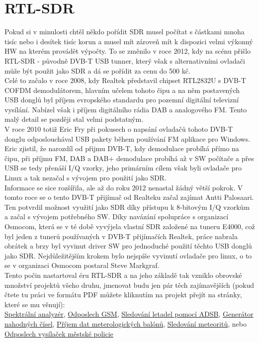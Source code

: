 \documentclass{ctuthesis}
\begin{document}
\section{RTL-SDR}
Pokud si v minulosti chtěl někdo pořídit SDR musel počítat s částkami mnoha tisíc nebo i desítek tisíc korun a musel mít zároveň mít k dispozici velmi výkonný HW na kterém provádět výpočty. To se změnilo v roce 2012, kdy na scénu přišlo RTL-SDR - původně DVB-T USB tunner, který však s alternativními ovladači může být použit jako SDR a dá se pořídit za cenu do 500 kč.\\
Celé to začalo v roce 2008, kdy Realtek představil chipset RTL2832U s  DVB-T COFDM demodulátorem, hlavním učelem tohoto čipu a na něm postavených USB donglů byl příjem evropského standardu pro pozemní digitální televizní vysílání. Nabízel však i příjem digitálního rádia DAB a analogového FM. Tento malý detail se později stal velmi podstatným.\\
V roce 2010 totiž Eric Fry při pokusech o napsání ovladačů tohoto DVB-T donglu odposlouchával USB pakety během používání FM aplikace pro Windows. Eric zjistil, že narozdíl od přijmu DVB-T, kdy demodulace probíhá přímo na čipu, při příjmu FM, DAB a DAB+ demodulace probíhá až v SW počítače a přes USB se tedy přenáší I/Q vzorky, jeho primárním cílem však byli ovladače pro Linux a tak nezačal s vývojem pro použití jako SDR.\\
Informace se sice rozšířila, ale až do roku 2012 nenastal žádný větší pokrok. V tomto roce se o tento DVB-T přijímač od Realteku začal zajímat Antti Palosaari. Ten potvrdil možnost využití jako SDR díky přístupu k 8-bitovým I/Q vzorkům a začal s vývojem potřebného SW. Díky navázání spolupráce s organizací Osmocom, která se v té době vyvýjela vlastní SDR založené na tuneru E4000, což byl jeden z tunerů používaných v DVB-T přijímačích Realtek, práce nabrala obrátek a brzy byl vyvinut driver SW pro jednoduché použití těchto USB donglů jako SDR. Nejdůležitějším krokem bylo nejspíše vyvinutí ovladače pro linux, o to se v organizaci Osmocom postaral Steve Markgraf.
\cite{rtlhistory2016}
\cite{rtlhistory2018}
\\
Tento počin nastartoval éru RTL-SDR a na jeho základě tak vzniklo obrovské množství projektů všeho druhu, jmenovat budu jen pár těch zajímavějších (pokud čtete tu práci ve formátu PDF můžete kliknutím na projekt přejít na stránky, které se mu věnují):\\ \href{https://www.rtl-sdr.com/rtl-sdr-used-as-a-spectrum-analyzer/}{Spektrální analyzér}, \href{https://www.rtl-sdr.com/rtl-sdr-tutorial-analyzing-gsm-with-airprobe-and-wireshark/}{Odposlech GSM}, \href{https://www.rtl-sdr.com/adsb-aircraft-radar-with-rtl-sdr/}{Sledování letadel pomocí ADSB}, \href{https://www.rtl-sdr.com/using-rtl-sdr-cheap-entropy-source/}{Generátor nahodných čísel}, \href{https://www.rtl-sdr.com/receiving-weather-balloon-data-with-rtl-sdr/}{Příjem dat meterologických balónů}, \href{https://www.rtl-sdr.com/meteor-reflection-observations-with-rtl-sdr/}{Sledování meteoritů}, nebo \href{https://technet.idnes.cz/odposlech-site-tetra-a-mestske-policie-dhy-/tec_technika.aspx?c=A160913_145939_tec_technika_vse}{Odposlech vysílaček městské policie}\\
\end{document}
